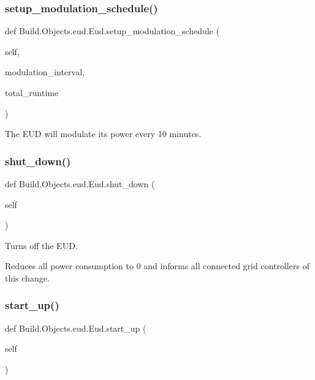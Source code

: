 \subsubsection{\texorpdfstring{setup\+\_\+modulation\+\_\+schedule()}{setup\_modulation\_schedule()}}
{\footnotesize\ttfamily def Build.\+Objects.\+eud.\+Eud.\+setup\+\_\+modulation\+\_\+schedule (\begin{DoxyParamCaption}\item[{}]{self,  }\item[{}]{modulation\+\_\+interval,  }\item[{}]{total\+\_\+runtime }\end{DoxyParamCaption})}



The E\+UD will modulate its power every 10 minutes. 

\mbox{\label{class_build_1_1_objects_1_1eud_1_1_eud_afc9354486371abba2f70e6a1605459e3}} 
\subsubsection{\texorpdfstring{shut\+\_\+down()}{shut\_down()}}
{\footnotesize\ttfamily def Build.\+Objects.\+eud.\+Eud.\+shut\+\_\+down (\begin{DoxyParamCaption}\item[{}]{self }\end{DoxyParamCaption})}



Turns off the E\+UD. 

Reduces all power consumption to 0 and informs all connected grid controllers of this change. \mbox{\label{class_build_1_1_objects_1_1eud_1_1_eud_a8601f950b8b11f28f9ec0e80965c8b25}} 
\subsubsection{\texorpdfstring{start\+\_\+up()}{start\_up()}}
{\footnotesize\ttfamily def Build.\+Objects.\+eud.\+Eud.\+start\+\_\+up (\begin{DoxyParamCaption}\item[{}]{self }\end{DoxyParamCaption})}



